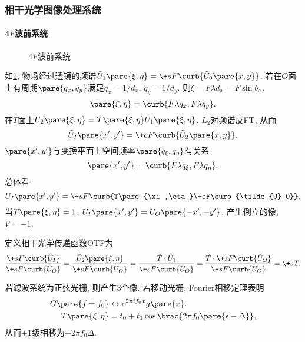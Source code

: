 \documentclass{ctexart}
\begin{document}

\subsubsection{相干光学图像处理系统} %
\label{ssub:相干光学图像处理系统}

\paragraph{4$F$波前系统} %
\label{par:4f波前系统}

\begin{figure}[ht]
    \centering
    \caption{4$F$波前系统}
    \label{fig:4F波前系统}
\end{figure}

如\cref{fig:4F波前系统}, 物场经过透镜的频谱$\tilde{U}_1\pare{\xi,\eta} = \+sF\curb{\tilde{U}_0\pare{x,y}}$. 若在$O$面上有周期$\pare{q_x,q_y}$满足$q_x = 1/d_x$, $q_y = 1/d_y$. 则$\xi = F\lambda d_x = F\sin\theta_x$.
\[ \pare{\xi,\eta} = \curb{F\lambda q_x, F\lambda q_y}. \]
在$T$面上$U_2\pare{\xi,\eta} = T\pare{\xi,\eta}U_1\pare{\xi,\eta}$. $L_2$对频谱反FT, 从而
\[ \tilde{U}_I\pare{x',y'} = \+cF\curb{\tilde{U}_2\pare{x,y}}. \]
$\pare{x',y'}$与变换平面上空间频率$\pare{q_\xi,q_\eta}$有关系
\[ \pare{x',y'} = \curb{F\lambda q_\xi, F\lambda q_\eta}. \]
总体看
\[ U_I\pare{x',y'} = \+sF\curb{T\pare{\xi,\eta}\+sF\curb{\tilde{U}_0}}. \]
当$T\pare{\xi,\eta} = 1$, $U_I\pare{x',y'} = U_O\pare{-x', -y'}$, 产生倒立的像, $V=-1$.
\par
定义相干光学传递函数OTF为
\[ \frac{\+sF\curb{\tilde{U}_I}}{\+sF\curb{\tilde{U}_O}} = \frac{\tilde{U}_2\pare{\xi,\eta}}{\+sF\curb{\tilde{U}_O}} = \frac{\tilde{T}\cdot\tilde{U}_1}{\+sF\curb{\tilde{U}_O}} = \frac{\tilde{T}\cdot \+sF\curb{\tilde{U}_O}}{\+sF\curb{\tilde{U}_O}} = \+sT. \]
\begin{sample}
    \begin{ex}
        若滤波系统为正弦光栅, 则产生$3$个像. 若移动光栅, Fourier相移定理表明
        \begin{align*}
            G\pare{f\pm f_0} & \leftrightarrow e^{2\pi if_0 x}g\pare{x}. \\
            T\pare{\xi,\eta} &=  t_0 + t_1 \cos\brac{2\pi f_0 \pare{\epsilon - \Delta}},
        \end{align*}
        从而$\pm 1$级相移为$\pm 2\pi f_0\Delta$.
    \end{ex}
\end{sample}
\end{document}
